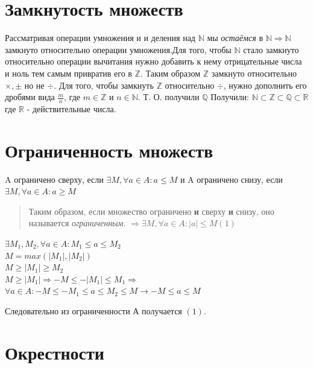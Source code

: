 \documentclass[oneside]{book}
\begin{document}

\section{Замкнутость множеств}

Рассматривая операции умножения и и деления над $\mathbb{N}$ мы \textit{остаёмся} в $\mathbb{N} \Rightarrow
\mathbb{N}$ замкнуто относительно операции умножения.Для того, чтобы $\mathbb{N}$ стало замкнуто относительно
операции вычитания нужно добавить к нему отрицательные числа и ноль тем самым привратив его в $\mathbb{Z}$.
Таким образом $\mathbb{Z}$ замкнуто относительно $\times, \pm$ но не $\div$. Для того, чтобы замкнуть
$\mathbb{Z}$ относительно $\div$, нужно дополнить его дробями вида $\frac{m}{n}$, где $m \in \mathbb{Z}$
и $n \in \mathbb{N}$. Т. О. получили $\mathbb{Q}$ Получили: $\mathbb{N} \subset \mathbb{Z} \subset \mathbb{Q}
\subset \mathbb{R}$ где $\mathbb{R}$ - действительные числа.

\section{Ограниченность множеств}

A ограничено сверху, если $\exists M, \forall a \in A : a \leq M$ и A ограничено снизу, если $\exists M, \forall a \in A : a \geq M$
\begin{quote}
    Таким образом, если множество ограничено \textbf{и} сверху \textbf{и} снизу, оно называется \textit{ограниченным}.
    $\Rightarrow \exists M, \forall a \in A : |a| \leq M (1)$
\end{quote}

\begin{center}
    $\exists M_1, M_2, \forall a \in A : M_1 \leq a \leq M_2$\\
    $M = max(|M_1|, |M_2|)$\\
    $M \geq |M_1| \geq M_2$\\
    $M \geq |M_1| \Rightarrow -M \leq -|M_1| \leq M_1 \Rightarrow$\\
    $\forall a \in A : -M \leq -M_1 \leq a \leq M_2 \leq M \rightarrow -M \leq a \leq M$
\end{center}
Следовательно из ограниченности А получается $(1)$.

\section{Окрестности}
\end{document}
